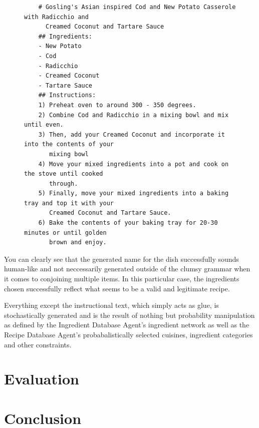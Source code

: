 \documentclass[9pt,titlepage,a4paper]{extarticle}
\newcommand\blankpage{%
    \null
    \thispagestyle{empty}%
    \addtocounter{page}{-1}%
    \newpage}
\begin{document}
    \begin{figure}[H]
        \begin{verbatim}
    # Gosling's Asian inspired Cod and New Potato Casserole with Radicchio and 
      Creamed Coconut and Tartare Sauce                                            
    ## Ingredients:
    - New Potato
    - Cod
    - Radicchio
    - Creamed Coconut                                                                                                                        
    - Tartare Sauce                                                                                                                          
    ## Instructions:                                                                                                                         
    1) Preheat oven to around 300 - 350 degrees.                                                                                             
    2) Combine Cod and Radicchio in a mixing bowl and mix until even.                                                            
    3) Then, add your Creamed Coconut and incorporate it into the contents of your 
       mixing bowl                                                
    4) Move your mixed ingredients into a pot and cook on the stove until cooked 
       through.                                                    
    5) Finally, move your mixed ingredients into a baking tray and top it with your 
       Creamed Coconut and Tartare Sauce.
    6) Bake the contents of your baking tray for 20-30 minutes or until golden 
       brown and enjoy.
        \end{verbatim}
    \end{figure}

    You can clearly see that the generated name for the dish successfully sounds human-like and not neccessarily generated
    outside of the clumsy grammar when it comes to conjoining multiple items. In this particular case, the ingredients chosen
    successfully reflect what seems to be a valid and legitimate recipe.

    Everything except the instructional text, which simply acts as glue, is stochastically generated and is the result
    of nothing but probability manipulation as defined by the Ingredient Database Agent's ingredient network as well as
    the Recipe Database Agent's probabalistically selected cuisines, ingredient categories and other constraints.

\section{Evaluation}

\section{Conclusion}


%

\blankpage
\end{document}
